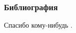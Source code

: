 \documentclass[11pt,
aspectratio=23, %
]{beamer}
\begin{document}
\section*{} %
\begin{frame}
\frametitle{Библиография}
\printbibliography[title={Библиография},heading=bibintoc]
\end{frame}


\begin{nobarframe}
\vfill
\begin{center}
\Large
Спасибо кому-нибудь .    
\end{center}
\vfill
\end{nobarframe}
\end{document}
